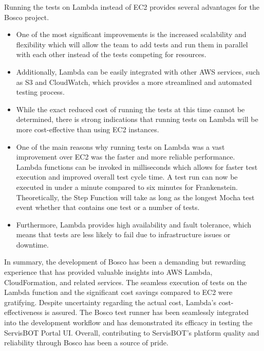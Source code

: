 \documentclass[12pt,a4paper,titlepage]{report}
\begin{document}
Running the tests on Lambda instead of EC2 provides several advantages for the Bosco project. 
\begin{itemize}
  \item One of the most significant improvements is the increased scalability and flexibility which will allow the team to add tests and run them in parallel with each other instead of the tests competing for resources. 
  \item Additionally, Lambda can be easily integrated with other AWS services, such as S3 and CloudWatch, which provides a more streamlined and automated testing process.
  \item While the exact reduced cost of running the tests at this time cannot be determined, there is strong indications that running tests on Lambda will be more cost-effective than using EC2 instances.
  \item One of the main reasons why running tests on Lambda was a vast improvement over EC2 was the faster and more reliable performance. Lambda functions can be invoked in milliseconds which allows for faster test execution and improved overall test cycle time. A test run can now be executed in under a minute compared to six minutes for Frankenstein. 
Theoretically, the Step Function will take as long as the longest Mocha test event whether that contains one test or a number of tests. 
\item Furthermore, Lambda provides high availability and fault tolerance, which means that tests are less likely to fail due to infrastructure issues or downtime.
\end{itemize}

In summary, the development of Bosco has been a demanding but rewarding experience that has provided valuable insights into AWS Lambda, CloudFormation, and related services. 
The seamless execution of tests on the Lambda function and the significant cost savings compared to EC2 were gratifying. 
Despite uncertainty regarding the actual cost, Lambda's cost-effectiveness is assured. 
The Bosco test runner has been seamlessly integrated into the development workflow and has demonstrated its efficacy in testing the ServisBOT Portal UI. 
Overall, contributing to ServisBOT's platform quality and reliability through Bosco has been a source of pride.
\end{document}
